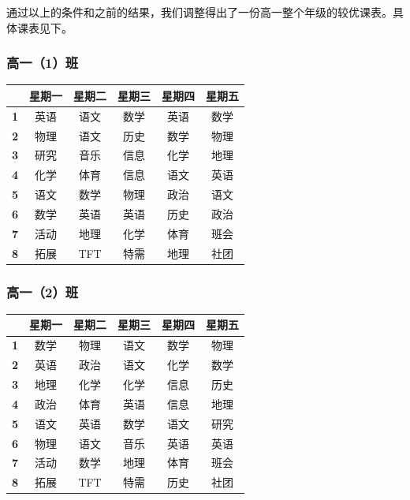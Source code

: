 \documentclass[a4paper]{article}
\begin{document}
  通过以上的条件和之前的结果，我们调整得出了一份高一整个年级的较优课表。具体课表见下。

  \clearpage

  \subsubsection{高一（1）班}

   \begin{tabular}{cccccc}
   \toprule
   & \bf 星期一 & \bf 星期二 & \bf 星期三 & \bf 星期四 & \bf 星期五 \\
   \midrule
   \bf 1 & 英语 & 语文 & 数学 & 英语 & 数学 \\
   \bf 2 & 物理 & 语文 & 历史 & 数学 & 物理 \\
   \bf 3 & 研究 & 音乐 & 信息 & 化学 & 地理 \\
   \bf 4 & 化学 & 体育 & 信息 & 语文 & 英语 \\
   \midrule
   \bf 5 & 语文 & 数学 & 物理 & 政治 & 语文 \\
   \bf 6 & 数学 & 英语 & 英语 & 历史 & 政治 \\
   \bf 7 & 活动 & 地理 & 化学 & 体育 & 班会 \\
   \bf 8 & 拓展 & TFT  & 特需 & 地理 & 社团 \\
   \bottomrule
   \end{tabular}

  \subsubsection{高一（2）班}

   \begin{tabular}{cccccc}
   \toprule
   & \bf 星期一 & \bf 星期二 & \bf 星期三 & \bf 星期四 & \bf 星期五 \\
   \midrule
   \bf 1 & 数学 & 物理 & 语文 & 数学 & 物理 \\
   \bf 2 & 英语 & 政治 & 语文 & 化学 & 数学 \\
   \bf 3 & 地理 & 化学 & 化学 & 信息 & 历史 \\
   \bf 4 & 政治 & 体育 & 英语 & 信息 & 地理 \\
   \midrule
   \bf 5 & 语文 & 英语 & 数学 & 语文 & 研究 \\
   \bf 6 & 物理 & 语文 & 音乐 & 英语 & 英语 \\
   \bf 7 & 活动 & 数学 & 地理 & 体育 & 班会 \\
   \bf 8 & 拓展 & TFT  & 特需 & 历史 & 社团 \\
   \bottomrule
   \end{tabular}
\end{document}
